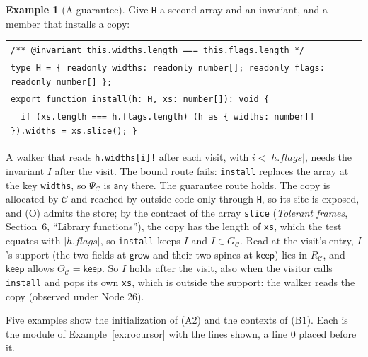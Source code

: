 \documentclass[10pt,a4paper]{article}
\theoremstyle{definition}
\newtheorem{example}[theorem]{Example}
\theoremstyle{remark}
\newcommand{\kw}[1]{\mathsf{#1}}
\newcommand{\keep}{\kw{keep}}
\newcommand{\grow}{\kw{grow}}
\newcommand{\any}{\kw{any}}
\newcommand{\len}[1]{|#1|}
\newcommand{\code}[1]{\texttt{#1}}
\newcommand{\cC}{\mathcal{C}}
\begin{document}
\begin{example}[A guarantee]\label{ex:roguar}
Give \code{H} a second array and an invariant, and a member that installs
a copy:
\begin{center}\small
\begin{tabular}{@{}l@{}}
\code{/** @invariant this.widths.length === this.flags.length */}\\
\code{type H = \{ readonly widths: readonly number[]; readonly flags: readonly number[] \};}\\
\code{export function install(h: H, xs: number[]): void \{}\\
\code{~~if (xs.length === h.flags.length) (h as \{ widths: number[] \}).widths = xs.slice(); \}}
\end{tabular}
\end{center}
A walker that reads \code{h.widths[i]!} after each visit, with
$i<\len{h.\mathit{flags}}$, needs the invariant $I$ after the visit. The
bound route fails: \code{install} replaces the array at the key
\code{widths}, so $\Psi_\cC$ is $\any$ there. The guarantee route holds.
The copy is allocated by $\cC$ and reached by outside code only through
\code{H}, so its site is exposed, and (O) admits the store; by the
contract of the array \code{slice} (\emph{Tolerant frames}, Section~6,
``Library functions''), the copy has the length of \code{xs},
which the test equates with $\len{h.\mathit{flags}}$, so \code{install}
keeps $I$ and $I\in G_\cC$. Read at the visit's entry, $I$'s support (the
two fields at $\grow$ and their two spines at $\keep$) lies in $R_\cC$,
and $\keep$ allows $\Theta_\cC=\keep$. So $I$ holds after the visit, also
when the visitor calls \code{install} and pops its own \code{xs}, which
is outside the support: the walker reads the copy (observed under Node 26).
\end{example}

\noindent
Five examples show the initialization of (A2) and the contexts of (B1).
Each is the module of
Example~\ref{ex:rocursor} with the lines shown, a line 0 placed before
it.
\end{document}
